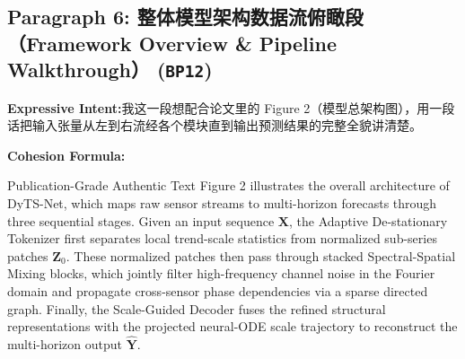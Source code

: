 \subsection*{Paragraph 6: 整体模型架构数据流俯瞰段（Framework Overview \& Pipeline Walkthrough） (\texttt{BP12})}
\noindent\textbf{Expressive Intent:}\enspace 我这一段想配合论文里的 Figure 2（模型总架构图），用一段话把输入张量从左到右流经各个模块直到输出预测结果的完整全貌讲清楚。\par
\noindent\textbf{Cohesion Formula:}\par\vspace{4pt}
\begin{ExampleBox}{Publication-Grade Authentic Text}
Figure 2 illustrates the overall architecture of DyTS-Net, which maps raw sensor streams to multi-horizon forecasts through three sequential stages. Given an input sequence $\mathbf{X}$, the Adaptive De-stationary Tokenizer first separates local trend-scale statistics from normalized sub-series patches $\mathbf{Z}_0$. These normalized patches then pass through stacked Spectral-Spatial Mixing blocks, which jointly filter high-frequency channel noise in the Fourier domain and propagate cross-sensor phase dependencies via a sparse directed graph. Finally, the Scale-Guided Decoder fuses the refined structural representations with the projected neural-ODE scale trajectory to reconstruct the multi-horizon output $\hat{\mathbf{Y}}$.
\end{ExampleBox}
